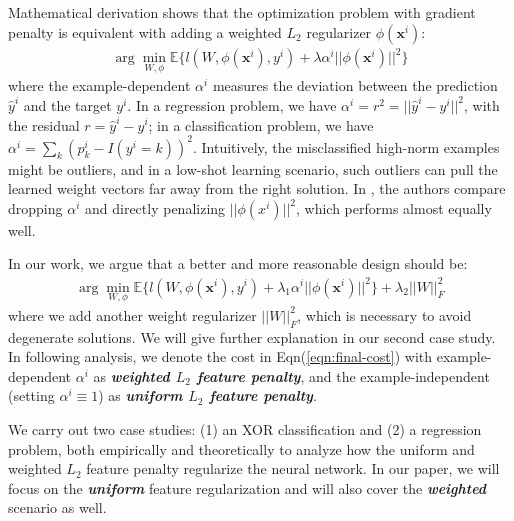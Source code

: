 Mathematical derivation shows that the optimization problem with gradient penalty is equivalent with adding a weighted $L_2$ regularizer $\phi(\mathbf{x}^i)$:
\begin{eqnarray}
\arg\min_{W,\phi}\mathbb{E}\{l(W,\phi(\mathbf{x}^i),y^i)+\lambda\alpha^i||\phi(\mathbf{x}^i)||^2\}
\label{eqn:cost}
\end{eqnarray}
where the example-dependent $\alpha^i$ measures the deviation between the prediction $\hat{y}^i$ and the target $y^i$.  %
In a regression problem, we have $\alpha^i=r^2=||\hat{y}^i-y^i||^2$, with the residual $r=\hat{y}^i-y^i$; in a classification problem, we have $\alpha^i=\sum_k(p^i_k-I(y^i=k))^2$. Intuitively, the misclassified high-norm examples might be outliers, and in a low-shot learning scenario, such outliers can pull the learned weight vectors far away from the right solution. In \cite{low-shot}, the authors compare dropping $\alpha^i$ and directly penalizing $||\phi(x^i)||^2$, which performs almost equally well. %

In our work, we argue that a better and more reasonable design should be:
\begin{eqnarray}
\arg\min_{W,\phi}\mathbb{E}\{l(W,\phi(\mathbf{x}^i),y^i)+\lambda_1\alpha^i||\phi(\mathbf{x}^i)||^2\}+\lambda_2||W||_F^2
\label{eqn:final-cost}
\end{eqnarray}
where we add another weight regularizer $||W||_F^2$, which is necessary to avoid degenerate solutions. We will give further explanation in our second case study. In following analysis, we denote the cost in Eqn(\ref{eqn:final-cost}) with example-dependent $\alpha^i$ as \textit{\textbf{weighted $L_2$ feature penalty}}, and the example-independent (setting $\alpha^i\equiv1$) as \textit{\textbf{uniform $L_2$ feature penalty}}. %

We carry out two case studies: (1) an XOR classification and (2) a regression problem, both empirically and theoretically to analyze how the uniform and weighted $L_2$ feature penalty regularize the neural network. In our paper, we will focus on the \textit{\textbf{uniform}} feature regularization and will also cover the \textit{\textbf{weighted}} scenario as well.






